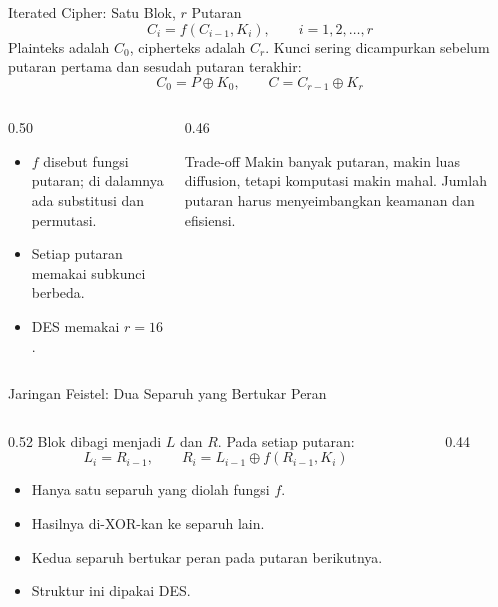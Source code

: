 \documentclass[aspectratio=169,11pt]{beamer}
\begin{document}
\begin{frame}{Iterated Cipher: Satu Blok, $r$ Putaran}
    \footnotesize
    \[
        C_i = f(C_{i-1}, K_i), \qquad i=1,2,\dots,r
    \]
    Plainteks adalah $C_0$, cipherteks adalah $C_r$. Kunci sering
    dicampurkan sebelum putaran pertama dan sesudah putaran terakhir:
    \[
        C_0 = P\oplus K_0, \qquad
        C = C_{r-1}\oplus K_r
    \]
    \begin{columns}[T,onlytextwidth]
        \begin{column}{0.50\textwidth}
            \begin{itemize}
                \item $f$ disebut fungsi putaran; di dalamnya ada
                      substitusi dan permutasi.
                \item Setiap putaran memakai subkunci berbeda.
                \item DES memakai $r=16$.
            \end{itemize}
        \end{column}
        \begin{column}{0.46\textwidth}
            \begin{alertblock}{Trade-off}
                \footnotesize
                Makin banyak putaran, makin luas diffusion, tetapi
                komputasi makin mahal. Jumlah putaran harus
                menyeimbangkan keamanan dan efisiensi.
            \end{alertblock}
        \end{column}
    \end{columns}
\end{frame}

\begin{frame}{Jaringan Feistel: Dua Separuh yang Bertukar Peran}
    \begin{columns}[T,onlytextwidth]
        \begin{column}{0.52\textwidth}
            \footnotesize
            Blok dibagi menjadi $L$ dan $R$. Pada setiap putaran:
            \[
                L_i = R_{i-1}, \qquad
                R_i = L_{i-1}\oplus f(R_{i-1},K_i)
            \]
            \begin{itemize}
                \item Hanya satu separuh yang diolah fungsi $f$.
                \item Hasilnya di-XOR-kan ke separuh lain.
                \item Kedua separuh bertukar peran pada putaran
                      berikutnya.
                \item Struktur ini dipakai DES.
            \end{itemize}
        \end{column}
        \begin{column}{0.44\textwidth}
            \begin{center}
            \end{center}
        \end{column}
    \end{columns}
\end{frame}
\end{document}
